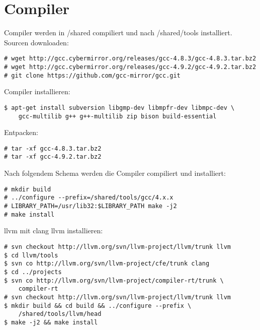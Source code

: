 \chapter{Compiler}
Compiler werden in /shared compiliert und nach /shared/tools installiert.\\
Sourcen downloaden:
\begin{lstlisting}[style=Bash]
# wget http://gcc.cybermirror.org/releases/gcc-4.8.3/gcc-4.8.3.tar.bz2
# wget http://gcc.cybermirror.org/releases/gcc-4.9.2/gcc-4.9.2.tar.bz2
# git clone https://github.com/gcc-mirror/gcc.git
\end{lstlisting}
Compiler installieren:
\begin{lstlisting}[style=Bash]
$ apt-get install subversion libgmp-dev libmpfr-dev libmpc-dev \
	gcc-multilib g++ g++-multilib zip bison build-essential
\end{lstlisting}
Entpacken:
\begin{lstlisting}[style=Bash]
# tar -xf gcc-4.8.3.tar.bz2
# tar -xf gcc-4.9.2.tar.bz2
\end{lstlisting}
Nach folgendem Schema werden die Compiler compiliert und installiert:
\begin{lstlisting}[style=Bash]
# mkdir build 
# ../configure --prefix=/shared/tools/gcc/4.x.x
# LIBRARY_PATH=/usr/lib32:$LIBRARY_PATH make -j2
# make install
\end{lstlisting}
llvm mit clang llvm installieren:
\begin{lstlisting}[style=Bash]
# svn checkout http://llvm.org/svn/llvm-project/llvm/trunk llvm
$ cd llvm/tools
$ svn co http://llvm.org/svn/llvm-project/cfe/trunk clang
$ cd ../projects
$ svn co http://llvm.org/svn/llvm-project/compiler-rt/trunk \
	compiler-rt
# svn checkout http://llvm.org/svn/llvm-project/llvm/trunk llvm
$ mkdir build && cd build && ../configure --prefix \
	/shared/tools/llvm/head
$ make -j2 && make install
\end{lstlisting}
